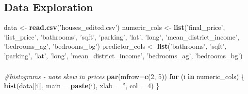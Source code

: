 \documentclass[11pt,]{article}
\newenvironment{Shaded}{\begin{snugshade}}{\end{snugshade}}
\newcommand{\CommentTok}[1]{\textcolor[rgb]{0.56,0.35,0.01}{\textit{#1}}}
\newcommand{\ControlFlowTok}[1]{\textcolor[rgb]{0.13,0.29,0.53}{\textbf{#1}}}
\newcommand{\DataTypeTok}[1]{\textcolor[rgb]{0.13,0.29,0.53}{#1}}
\newcommand{\DecValTok}[1]{\textcolor[rgb]{0.00,0.00,0.81}{#1}}
\newcommand{\KeywordTok}[1]{\textcolor[rgb]{0.13,0.29,0.53}{\textbf{#1}}}
\newcommand{\NormalTok}[1]{#1}
\newcommand{\StringTok}[1]{\textcolor[rgb]{0.31,0.60,0.02}{#1}}
\begin{document}
\hypertarget{data-exploration}{%
\subsection{Data Exploration}\label{data-exploration}}

\begin{Shaded}
\begin{Highlighting}[]
\NormalTok{data <-}\StringTok{ }\KeywordTok{read.csv}\NormalTok{(}\StringTok{'houses_edited.csv'}\NormalTok{)}
\NormalTok{numeric_cols <-}\StringTok{ }\KeywordTok{list}\NormalTok{(}\StringTok{'final_price'}\NormalTok{, }\StringTok{'list_price'}\NormalTok{, }\StringTok{'bathrooms'}\NormalTok{, }\StringTok{'sqft'}\NormalTok{, }\StringTok{'parking'}\NormalTok{, }\StringTok{'lat'}\NormalTok{, }\StringTok{'long'}\NormalTok{, }\StringTok{'mean_district_income'}\NormalTok{, }\StringTok{'bedrooms_ag'}\NormalTok{, }\StringTok{'bedrooms_bg'}\NormalTok{)}
\NormalTok{predictor_cols <-}\StringTok{ }\KeywordTok{list}\NormalTok{(}\StringTok{'bathrooms'}\NormalTok{, }\StringTok{'sqft'}\NormalTok{, }\StringTok{'parking'}\NormalTok{, }\StringTok{'lat'}\NormalTok{, }\StringTok{'long'}\NormalTok{, }\StringTok{'mean_district_income'}\NormalTok{, }\StringTok{'bedrooms_ag'}\NormalTok{, }\StringTok{'bedrooms_bg'}\NormalTok{)}
\end{Highlighting}
\end{Shaded}

\hypertarget{section}{%
\subsubsection{}\label{section}}

\begin{Shaded}
\begin{Highlighting}[]
\CommentTok{#histograms - note skew in prices}
\KeywordTok{par}\NormalTok{(}\DataTypeTok{mfrow=}\KeywordTok{c}\NormalTok{(}\DecValTok{2}\NormalTok{, }\DecValTok{5}\NormalTok{))}
\ControlFlowTok{for}\NormalTok{ (i }\ControlFlowTok{in}\NormalTok{ numeric_cols) \{}
  \KeywordTok{hist}\NormalTok{(data[[i]], }\DataTypeTok{main =} \KeywordTok{paste}\NormalTok{(i), }\DataTypeTok{xlab =} \StringTok{''}\NormalTok{, }\DataTypeTok{col =} \DecValTok{4}\NormalTok{)}
\NormalTok{\}}
\end{Highlighting}
\end{Shaded}
\end{document}
